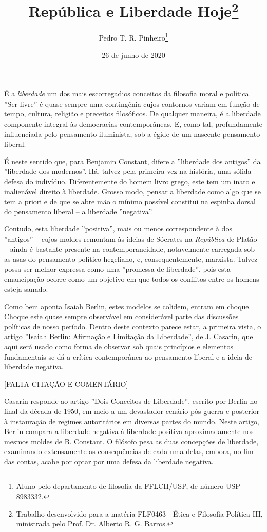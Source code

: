 \documentclass[12pt,a4paper]{article}
\author{Pedro T. R. Pinheiro\footnote{Aluno pelo departamento de filosofia 
da FFLCH/USP, de número USP 8983332. }}
\title{República e Liberdade Hoje\footnote{
	Trabalho desenvolvido para a matéria FLF0463 - Ética e Filosofia 
	Política III, ministrada pelo Prof. Dr. Alberto R. G. Barros. }}
\date{26 de junho de 2020}
\begin{document}
	\maketitle
	
	\onehalfspacing
	\setlength{\parskip}{0.5cm}

	É a \textit{liberdade} um dos mais escorregadios conceitos da 
	filosofia moral e política. ”Ser livre” é quase sempre uma 
	contingênia cujos contornos variam em função de tempo, cultura, 
	religião e preceitos filosóficos. De qualquer maneira, é a 
	liberdade componente integral às democracias contemporâneas. E, 
	como tal, profundamente influenciada pelo pensamento iluminista, 
	sob a égide de um nascente pensamento liberal. 

	É neste sentido que, para Benjamin Constant, difere a ”liberdade 
	dos antigos” da ”liberdade dos modernos”. Há, talvez pela primeira 
	vez na história, uma sólida defesa do indivíduo. Diferentemente do 
	homem livro grego, este tem um inato e inalienável direito à 
	liberdade. Grosso modo, pensar a liberdade como algo que se tem 
	a priori e de que se abre mão o mínimo possível constitui na 
	espinha dorsal do pensamento liberal -- a liberdade ”negativa”. 

	Contudo, esta liberdade ”positiva”, mais ou menos correspondente 
	à dos ”antigos” -- cujos moldes remontam às ideias de Sócrates na 
	\textit{República} de Platão -- ainda é bastante presente na 
	contemporaneidade, notavelmente carregada sob as asas do pensamento 
	político hegeliano, e, consequentemente, marxista. Talvez possa ser 
	melhor expressa como uma ”promessa de liberdade”, pois esta 
	emancipação ocorre como um objetivo em que todos os conflitos entre 
	os homens esteja sanado. 

	Como bem aponta Isaiah Berlin, estes modelos se colidem, entram em 
	choque. Choque este quase sempre observável em considerável parte 
	das discussões políticas de nosso período. Dentro deste contexto 
	parece estar, a primeira vista, o artigo ”Isaiah Berlin: Afirmação 
	e Limitação da Liberdade”, de J. Casarin, que aqui será usado como 
	forma de observar sob quais princípios e elementos fundamentais se 
	dá a crítica contemporânea ao pensamento liberal e a ideia de 
	liberdade negativa. 

	[FALTA CITAÇÃO E COMENTÁRIO]
	
	Casarin responde ao artigo ”Dois Conceitos de Liberdade”, escrito 
	por Berlin no final da década de 1950, em meio a um devastador 
	cenário pós-guerra e posterior à instauração de regimes autoritários 
	em diversas partes do mundo. Neste artigo, Berlin compara a liberdade 
	negativa à liberdade positiva aproximadamente nos mesmos moldes de 
	B. Constant. O filósofo pesa as duas concepções de liberdade, 
	examinando extensamente as consequências de cada uma delas, embora, 
	no fim das contas, acabe por optar por uma defesa da liberdade 
	negativa. 
\end{document}
